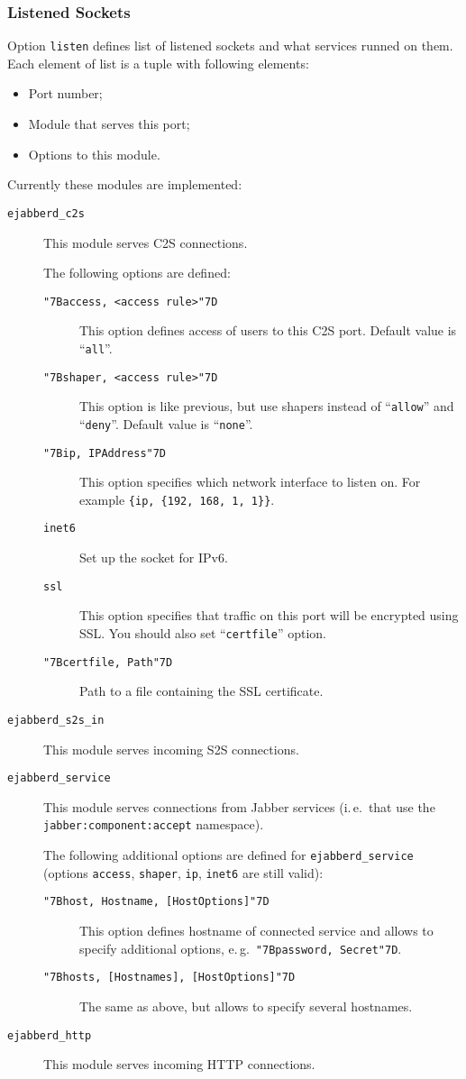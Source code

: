 \documentclass[a4paper,10pt]{article}
\newcommand{\bracehack}{\def\{{\char"7B}\def\}{\char"7D}}
\newcommand{\ns}[1]{\texttt{#1}}
\newcommand{\option}[1]{\texttt{#1}}
\newcommand{\poption}[1]{{\bracehack\texttt{#1}}}
\newcommand{\term}[1]{\texttt{#1}}
\newcommand{\Jabber}{Jabber}
\newcommand{\titem}[1]{\item[\bracehack\texttt{#1}]}
\begin{document}
\subsubsection{Listened Sockets}
\label{sec:configlistened}

Option \option{listen} defines list of listened sockets and what services
runned on them.  Each element of list is a tuple with following elements:
\begin{itemize}
\item Port number;
\item Module that serves this port;
\item Options to this module.
\end{itemize}

Currently these modules are implemented:
\begin{description}
  \titem{ejabberd\_c2s} This module serves C2S connections.
  
  The following options are defined:
  \begin{description}
    \titem{\{access, <access rule>\}} This option defines access of users
    to this C2S port.  Default value is ``\term{all}''.
    \titem{\{shaper, <access rule>\}} This option is like previous, but
    use shapers instead of ``\term{allow}'' and ``\term{deny}''.  Default
    value is ``\term{none}''.
    \titem{\{ip, IPAddress\}} This option specifies which network interface to
    listen on. For example \verb|{ip, {192, 168, 1, 1}}|.
    \titem{inet6} Set up the socket for IPv6.
    \titem{ssl} This option specifies that traffic on this port will be
    encrypted using SSL.  You should also set ``\verb|certfile|'' option.
    \titem{\{certfile, Path\}} Path to a file containing the SSL certificate.
  \end{description}
  \titem{ejabberd\_s2s\_in} This module serves incoming S2S connections.
  \titem{ejabberd\_service} This module serves connections from \Jabber{}
  services (i.\,e.\ that use the \ns{jabber:component:accept} namespace).
  
  The following additional options are defined for \term{ejabberd\_service}
  (options \option{access}, \option{shaper}, \option{ip}, \option{inet6} are
  still valid):
  \begin{description}
    \titem{\{host, Hostname, [HostOptions]\}} This option defines hostname of connected
    service and allows to specify additional options, e.\,g.\
    \poption{\{password, Secret\}}.
    \titem{\{hosts, [Hostnames], [HostOptions]\}} The same as above, but allows to
    specify several hostnames.
  \end{description}
  \titem{ejabberd\_http} This module serves incoming HTTP connections.


\end{description}
\end{document}
